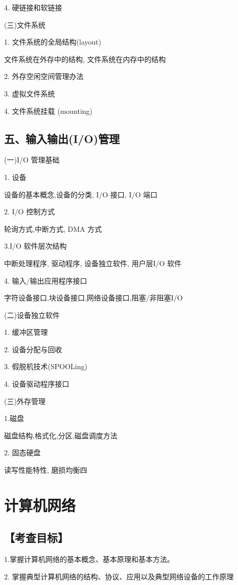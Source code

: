 \documentclass[10pt]{article}
\begin{document}
4. {\color{red} 硬链接和软链接}

(三)文件系统

1. 文件系统的全局结构(layout)

文件系统在外存中的结构, 文件系统在内存中的结构

2. 外存空闲空间管理办法

3. 虚拟文件系统

{\color{red} 4. 文件系统挂载 (mounting)}

\subsection*{五、输入输出(I/O)管理}

{\color{red}
(一)I/O 管理基础

1. 设备

设备的基本概念,设备的分类, I/O 接口, I/O 端口

2. I/O 控制方式

轮询方式,中断方式, DMA 方式

3.I/O 软件层次结构

中断处理程序, 驱动程序, 设备独立软件, 用户层I/O 软件

4. 输入/输出应用程序接口

字符设备接口,块设备接口,网络设备接口,阻塞/非阻塞I/O

(二)设备独立软件

1. 缓冲区管理

2. 设备分配与回收

3. 假脱机技术(SPOOLing)

4. 设备驱动程序接口
}

(三)外存管理

1.磁盘

磁盘结构,格式化,分区,磁盘调度方法

2. 固态硬盘

读写性能特性, 磨损均衡四

\section*{计算机网络 }

\subsection*{【考查目标】} 

1.掌握计算机网络的基本概念、基本原理和基本方法。 

2. 掌握典型计算机网络的结构、协议、应用以及典型网络设备的工作原理 
\end{document}
